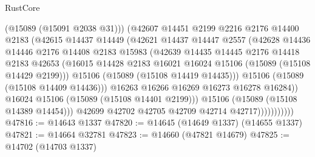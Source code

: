 \begin{lexlean}{RustCore}
\begin{coremodule}
                              (@15089 (@15091 @2038 @31)))
                            (@42607
                              @14451
                              @2199
                              @2216
                              @2176
                              @14400
                              @2183
                              (@42615
                                @14437
                                @14449
                                (@42621
                                  @14437
                                  @14447
                                  @2557
                                  (@42628
                                    @14436
                                    @14446
                                    @2176
                                    @14408
                                    @2183
                                    @15983
                                    (@42639
                                      @14435
                                      @14445
                                      @2176
                                      @14418
                                      @2183
                                      @42653
                                      (@16015
                                        @14428
                                        @2183
                                        @16021
                                        @16024
                                        @15106
                                        (@15089 (@15108 @14429 @2199)))
                                      @15106
                                      (@15089 (@15108 @14419 @14435)))
                                    @15106
                                    (@15089 (@15108 @14409 @14436)))
                                  @16263
                                  @16266
                                  @16269
                                  @16273
                                  @16278
                                  @16284))
                              @16024
                              @15106
                              (@15089 (@15108 @14401 @2199)))
                            @15106
                            (@15089 (@15108 @14389 @14454)))
                          @42699
                          @42702
                          @42705
                          @42709
                          @42714
                          @42717)))))))))))
@47816 := @14643 @1337
@47820 := @14645 (@14649 @1337) (@14655 @1337)
@47821 := @14664 @32781
@47823 := @14660 (@47821 @14679)
@47825 := @14702 (@14703 @1337)

\end{coremodule}
\end{lexlean}
